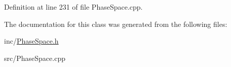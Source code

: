 Definition at line 231 of file Phase\+Space.\+cpp.



The documentation for this class was generated from the following files\+:\begin{DoxyCompactItemize}
\item 
inc/\hyperlink{PhaseSpace_8h}{Phase\+Space.\+h}\item 
src/Phase\+Space.\+cpp\end{DoxyCompactItemize}
